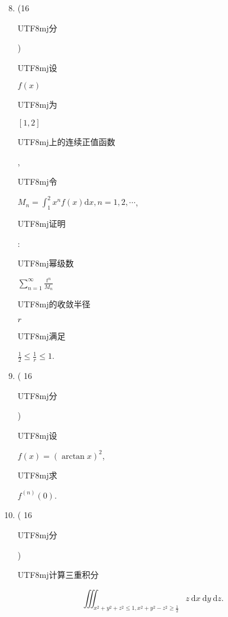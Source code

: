\documentclass[10pt]{article}
\begin{document}
\begin{enumerate}
  \setcounter{enumi}{7}
  \item (16 \begin{CJK}{UTF8}{mj}分\end{CJK}) \begin{CJK}{UTF8}{mj}设\end{CJK} $f(x)$ \begin{CJK}{UTF8}{mj}为\end{CJK} $[1,2]$ \begin{CJK}{UTF8}{mj}上的连续正值函数\end{CJK}, \begin{CJK}{UTF8}{mj}令\end{CJK} $M_{n}=\int_{1}^{2} x^{n} f(x) \mathrm{d} x, n=1,2, \cdots$, \begin{CJK}{UTF8}{mj}证明\end{CJK}: \begin{CJK}{UTF8}{mj}幂级数\end{CJK} $\sum_{n=1}^{\infty} \frac{t^{n}}{M_{n}}$ \begin{CJK}{UTF8}{mj}的收敛半径\end{CJK} $r$ \begin{CJK}{UTF8}{mj}满足\end{CJK} $\frac{1}{2} \leqslant \frac{1}{r} \leqslant 1$.

  \item ( 16 \begin{CJK}{UTF8}{mj}分\end{CJK}) \begin{CJK}{UTF8}{mj}设\end{CJK} $f(x)=(\arctan x)^{2}$, \begin{CJK}{UTF8}{mj}求\end{CJK} $f^{(n)}(0)$.

  \item ( 16 \begin{CJK}{UTF8}{mj}分\end{CJK}) \begin{CJK}{UTF8}{mj}计算三重积分\end{CJK}

\end{enumerate}
$$
\iiint_{x^{2}+y^{2}+z^{2} \leqslant 1, x^{2}+y^{2}-z^{2} \geqslant \frac{1}{2}} z \mathrm{~d} x \mathrm{~d} y \mathrm{~d} z .
$$
\end{document}
